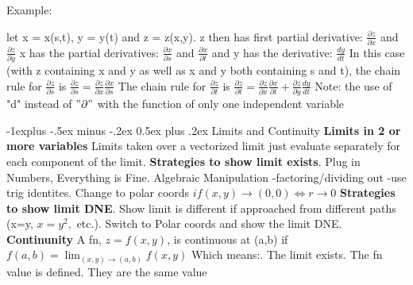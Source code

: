 \documentclass[10pt,landscape]{article}
\makeatletter
\renewcommand{\subsection}{\@startsection{subsection}{2}{0mm}%
                                {-1explus -.5ex minus -.2ex}%
                                {0.5ex plus .2ex}%
                                {\normalfont\normalsize\bfseries}}
\makeatother
\begin{document}
\begin{multicols*}{5}
Example:\newline

let x = x(s,t), y = y(t) and z = z(x,y).\newline
z then has first partial derivative:\newline
$ \frac{\partial z}{\partial x} $ and $ \frac{\partial z}{\partial y} $ \newline
x has the partial derivatives:\newline
$ \frac{\partial x}{\partial s} $ and $ \frac{\partial x}{\partial t} $ \newline
and y has the derivative:\newline
$ \frac{dy}{dt} $ \newline
In this case (with z containing x and y as well as x and y both containing s and t), the chain rule for $ \frac{\partial z}{\partial s} $ is $ \frac{\partial z}{\partial s} = \frac{\partial z}{\partial x} \frac{\partial x}{\partial s} $\newline
The chain rule for $ \frac{\partial z}{\partial t} $ is $ \frac{\partial z}{\partial t} = \frac{\partial z}{\partial x} \frac{\partial x}{\partial t} + \frac{\partial z}{\partial y} \frac{dy}{dt}$\newline
Note: the use of "d" instead of $ "\partial" $ with the function of only one independent variable

\subsection{Limits and Continuity}
\textbf{Limits in 2 or more variables}\newline
Limits taken over a vectorized limit just evaluate separately for each component of the limit.\newline
\textbf{Strategies to show limit exists}. Plug in Numbers, Everything is Fine. Algebraic Manipulation\newline
-factoring/dividing out\newline
-use trig identites. Change to polar coords\newline
\:\:$if (x,y)\to(0,0)\Leftrightarrow r\to0$\newline
\textbf{Strategies to show limit DNE}. Show limit is different if approached from different paths\newline
(x=y, $x=y^2,$ etc.). Switch to Polar coords and show the limit DNE.\newline
\textbf{Continunity}\newline
A fn, $z=f(x,y)$, is continuous at (a,b) if\newline
$f(a,b) = \lim_{(x,y) \to (a,b)} f(x,y) $\newline
Which means:. The limit exists. The fn value is defined. They are the same value


\end{multicols*}
\end{document}
